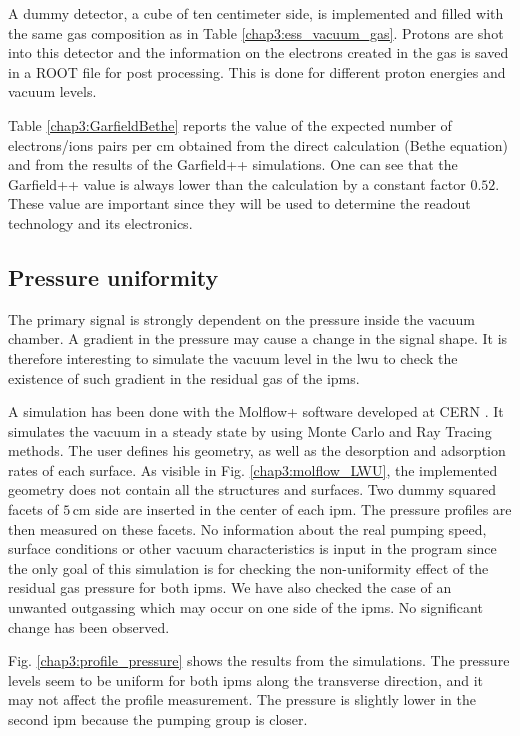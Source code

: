 \begin{refsection}
  
  A dummy detector, a cube of ten centimeter side, is implemented and filled with the same gas composition as in Table \ref{chap3:ess_vacuum_gas}. Protons are shot into this detector and the information on the electrons created in the gas is saved in a ROOT file \cite{Brun1997,Antcheva2009} for post processing. This is done for different proton energies and vacuum levels.

  Table \ref{chap3:GarfieldBethe} reports the value of the expected number of electrons/ions pairs per cm obtained from the direct calculation (Bethe equation) and from the results of the Garfield++ simulations. One can see that the Garfield++ value is always lower than the calculation by a constant factor $0.52$. These value are important since they will be used to determine the readout technology and its electronics. 

  \subsection{Pressure uniformity}
  The primary signal is strongly dependent on the pressure inside the vacuum chamber. A gradient in the pressure may cause a change in the signal shape. It is therefore interesting to simulate the vacuum level in the \acrshort{lwu} to check the existence of such gradient in the residual gas of the \acrshort{ipm}s.

  
  A simulation has been done with the Molflow+ software developed at CERN \cite{Kersevan2009}. It simulates the vacuum in a steady state by using Monte Carlo and Ray Tracing methods. The user defines his geometry, as well as the desorption and adsorption rates of each surface. As visible in Fig. \ref{chap3:molflow_LWU}, the implemented geometry does not contain all the structures and surfaces. Two dummy squared facets of $5\,\mathrm{cm}$ side are inserted in the center of each \acrshort{ipm}. The pressure profiles are then measured on these facets. No information about the real pumping speed, surface conditions or other vacuum characteristics is input in the program since the only goal of this simulation is for checking the non-uniformity effect of the residual gas pressure for both \acrshort{ipm}s. We have also checked the case of an unwanted outgassing which may occur on one side of the \acrshort{ipm}s. No significant change has been observed.

  Fig. \ref{chap3:profile_pressure} shows the results from the simulations. The pressure levels seem to be uniform for both \acrshort{ipm}s along the transverse direction, and it may not affect the profile measurement. The pressure is slightly lower in the second \acrshort{ipm} because the pumping group is closer.


\end{refsection}

